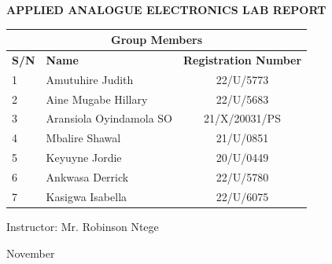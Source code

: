 \documentclass[12pt,a4paper]{report}
\begin{document}
\begin{titlepage}
\begin{center}
        \textbf{\Large APPLIED ANALOGUE ELECTRONICS LAB REPORT}\\
        \vspace{30pt}
        \begin{table}[H]
        \centering
        \begin{tabular}{|llc|}
        \hline
        \multicolumn{3}{|c|}{\textbf{Group Members}}                                                                     \\ \hline
        \multicolumn{1}{|l|}{\textbf{S/N}} & \multicolumn{1}{l|}{\textbf{Name}}           & \textbf{Registration Number} \\ \hline
        \multicolumn{1}{|l|}{1}            & \multicolumn{1}{l|}{Amutuhire Judith}        & 22/U/5773                    \\ \hline
        \multicolumn{1}{|l|}{2}            & \multicolumn{1}{l|}{Aine Mugabe Hillary}     & 22/U/5683                    \\ \hline
        \multicolumn{1}{|l|}{3}            & \multicolumn{1}{l|}{Aransiola Oyindamola SO} & 21/X/20031/PS                \\ \hline
        \multicolumn{1}{|l|}{4}            & \multicolumn{1}{l|}{Mbalire Shawal} & 21/U/0851                \\ \hline
        \multicolumn{1}{|l|}{5}            & \multicolumn{1}{l|}{Keyuyne Jordie} & 20/U/0449                \\ \hline
        \multicolumn{1}{|l|}{6}            & \multicolumn{1}{l|}{Ankwasa Derrick} & 22/U/5780                \\ \hline
        \multicolumn{1}{|l|}{7}            & \multicolumn{1}{l|}{Kasigwa Isabella} & 22/U/6075                \\ \hline
        \end{tabular}
        \end{table}
       
        \vspace{40pt}

        \normalsize Instructor: Mr. Robinson Ntege\\
        \vspace{30pt}

        \normalsize November\\
        \vspace{40pt}

    \end{center}
\end{titlepage}
\tableofcontents
\newpage
\end{document}
